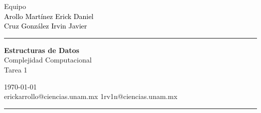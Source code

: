 \documentclass[a4paper,10pt]{article}
\begin{document}
\fancyhead[C]{}
\begin{minipage}{0.295\textwidth} 
\raggedright
Equipo\\    
\footnotesize 
\colorbox[rgb]{0.94, 0.86, 0.51}{\textcolor{black}{Arollo Martínez Erick Daniel}}
\\\colorbox[rgb]{0.96, 0.76, 0.76}{\textcolor{black}{Cruz González Irvin Javier}}
\textcolor[rgb]{0.8, 0.58, 0.46}{\medskip\hrule}
\end{minipage}
\begin{minipage}{0.4\textwidth} 
\centering 
\large 
\textbf{Estructuras de Datos }\\ 
\normalsize 
Complejidad Computacional\\
Tarea 1
\end{minipage}
\begin{minipage}{0.295\textwidth} 
\raggedleft
\today\\ 
\footnotesize
erickarrollo@ciencias.unam.mx
1rv1n@ciencias.unam.mx
\textcolor[rgb]{0.8, 0.58, 0.46}{\medskip\hrule}
\end{minipage}
\end{document}
